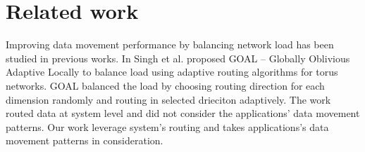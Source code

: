 \section{Related work}
\label{sec:relatedwork}

Improving data movement performance by balancing network load has been studied in previous works. In \cite{singh2003:GOAL} Singh et al. proposed GOAL -- Globally Oblivious Adaptive Locally to balance load using adaptive routing algorithms for torus networks. GOAL balanced the load by choosing routing direction for each dimension randomly and routing in selected drieciton adaptively. The work routed data at system level and did not consider the applications' data movement patterns. Our work leverage system's routing and takes applications's data movement patterns in consideration.



